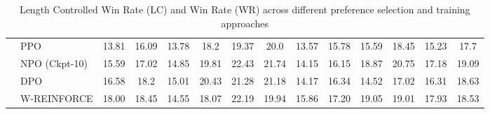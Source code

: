 \begin{table}[t]
\begin{tabular}{ll|cc|cc|cc|cc|cc|cc}
  & PPO & 13.81 & 16.09 & 13.78 & 18.2 & 19.37 & 20.0 & 13.57 & 15.78 & 15.59 & 18.45 & 15.23 & 17.7 \\
  & NPO (Ckpt-10) & 15.59 & 17.02 & 14.85 & 19.81 & 22.43 & 21.74 & 14.15 & 16.15 & 18.87 & 20.75 & 17.18 & 19.09 \\
  & DPO & 16.58 & 18.2 & 15.01 & 20.43 & 21.28 & 21.18 & 14.17 & 16.34 & 14.52 & 17.02 & 16.31 & 18.63 \\
  & W-REINFORCE & 18.00 & 18.45 & 14.55 & 18.07 & 22.19 & 19.94 & 15.86 & 17.20 & 19.05 & 19.01 & 17.93 & 18.53 \\
\bottomrule
\end{tabular}
\caption{Length Controlled Win Rate (LC) and Win Rate (WR) across different preference selection and training approaches}
\label{tab:methods_comparison}
\end{table}
